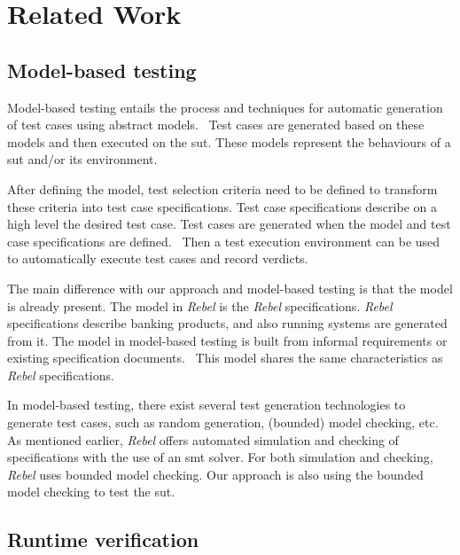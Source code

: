 \section{Related Work}

\subsection*{Model-based testing}

Model-based testing entails the process and techniques for automatic generation
of test cases using abstract models.~\cite{utting2012taxonomy, tretmans2008model, dalal1999model}
Test cases are generated based on these models and then executed on the
\gls{sut}. These models represent the behaviours of a \gls{sut} and/or its
environment.~\cite{utting2012taxonomy, tretmans2008model}

After defining the model, test selection criteria need to be defined to
transform these criteria into test case specifications. Test case specifications
describe on a high level the desired test case. Test cases are generated when
the model and test case specifications are defined.~\cite{utting2012taxonomy}
Then a test execution environment can be used to automatically execute test
cases and record verdicts.

The main difference with our approach and model-based testing is that the model
is already present. The model in \textit{Rebel} is the \textit{Rebel}
specifications. \textit{Rebel} specifications describe banking products, and
also running systems are generated from it. The model in model-based testing is
built from informal requirements or existing specification
documents.~\cite[p.~2]{utting2012taxonomy} This model
shares the same characteristics as \textit{Rebel} specifications.

In model-based testing, there exist several test generation technologies to
generate test cases, such as random generation, (bounded) model checking,
etc.~\cite[p.~8-9]{utting2012taxonomy}
As mentioned earlier, \textit{Rebel} offers automated simulation and checking of
specifications with the use of an \gls{smt} solver. For both simulation and
checking, \textit{Rebel} uses bounded model checking. Our approach is also using
the bounded model checking to test the \gls{sut}.

\subsection*{Runtime verification}


